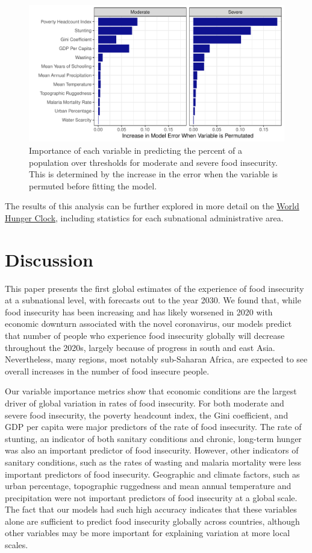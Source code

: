 \documentclass{article}
\begin{document}
\begin{figure}[h]
  \centering
  \includegraphics[width=\linewidth]{img/VIMP.pdf}
  \caption{Importance of each variable in predicting the percent of a population over thresholds for moderate and severe food insecurity.  This is determined by the increase in the error when the variable is permuted before fitting the model.}
  \label{fig:map}
\end{figure}


The results of this analysis can be further explored in more detail on the \href{https://worldhunger.io}{World Hunger Clock}, including statistics for each subnational administrative area.

\section{Discussion}
This paper presents the first global estimates of the experience of food insecurity at a subnational level, with forecasts out to the year 2030.  We found that, while food insecurity has been increasing and has likely worsened in 2020 with economic downturn associated with the novel coronavirus, our models predict that number of people who experience food insecurity globally will decrease throughout the 2020s, largely because of progress in south and east Asia.  Nevertheless, many regions, most notably sub-Saharan Africa, are expected to see overall increases in the number of food insecure people. 

Our variable importance metrics show that economic conditions are the largest driver of global variation in rates of food insecurity.  For both moderate and severe food insecurity, the poverty headcount index, the Gini coefficient, and GDP per capita were major predictors of the rate of food insecurity.  The rate of stunting, an indicator of both sanitary conditions and chronic, long-term hunger was also an important predictor of food insecurity.  However, other indicators of sanitary conditions, such as the rates of wasting and malaria mortality were less important predictors of food insecurity.  Geographic and climate factors, such as urban percentage, topographic ruggedness and mean annual temperature and precipitation were not important predictors of food insecurity at a global scale.  The fact that our models had such high accuracy indicates that these variables alone are sufficient to predict food insecurity globally across countries, although other variables may be more important for explaining variation at more local scales.
\end{document}
